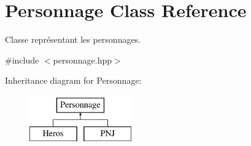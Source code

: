\hypertarget{class_personnage}{\section{Personnage Class Reference}
\label{class_personnage}
}


Classe représentant les personnages.  




{\ttfamily \#include $<$personnage.\-hpp$>$}

Inheritance diagram for Personnage\-:\begin{figure}[H]
\begin{center}
\leavevmode
\includegraphics[height=2.000000cm]{class_personnage}
\end{center}
\end{figure}
